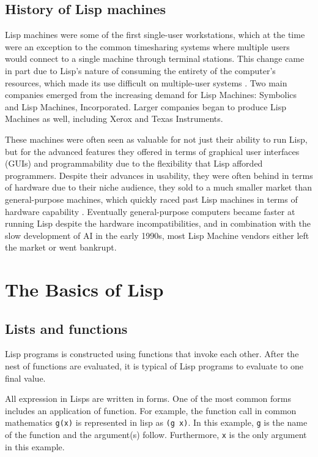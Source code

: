 \documentclass[journal]{IEEEtran}
\begin{document}
\subsection{History of Lisp machines}
Lisp machines were some of the first single-user workstations, which at the time were an exception to the common timesharing systems where multiple users would connect to a single machine through terminal stations. This change came in part due to Lisp's nature of consuming the entirety of the computer's resources, which made its use difficult on multiple-user systems \cite{andromeda}. Two main companies emerged from the increasing demand for Lisp Machines: Symbolics and Lisp Machines, Incorporated. Larger companies began to produce Lisp Machines as well, including Xerox and Texas Instruments. 

These machines were often seen as valuable for not just their ability to run Lisp, but for the advanced features they offered in terms of graphical user interfaces (GUIs) and programmability due to the flexibility that Lisp afforded programmers. Despite their advances in usability, they were often behind in terms of hardware due to their niche audience, they sold to a much smaller market than general-purpose machines, which quickly raced past Lisp machines in terms of hardware capability \cite{withington}. Eventually general-purpose computers became faster at running Lisp despite the hardware incompatibilities, and in combination with the slow development of AI in the early 1990s, most Lisp Machine vendors either left the market or went bankrupt.

\section{The Basics of Lisp}

\subsection{Lists and functions}
Lisp programs is constructed using functions that invoke each other. After the nest of functions are evaluated, it is typical of Lisp programs to evaluate to one final value.

All expression in Lisps are written in forms. One of the most common forms includes an application of function. For example, the function call in common mathematics \texttt{g(x)} is represented in lisp as \texttt{(g x)}. In this example, \texttt{g} is the name of the function and the argument(s) follow. Furthermore, \texttt{x} is the only argument in this example.
\end{document}
